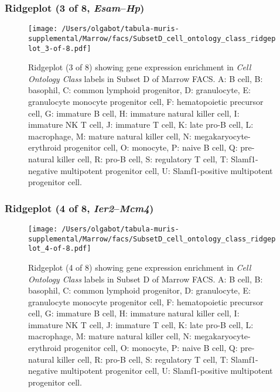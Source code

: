 \subsubsection{Ridgeplot (3 of 8, \emph{Esam}--\emph{Hp})}
\begin{figure}[h]
\centering
\texttt{[image: /Users/olgabot/tabula-muris-supplemental/Marrow/facs/SubsetD\_cell\_ontology\_class\_ridgeplot\_3-of-8.pdf]}

\caption{ Ridgeplot (3 of 8)  showing gene expression enrichment in \emph{Cell Ontology Class} labels in Subset D of Marrow FACS. A: B cell, B: basophil, C: common lymphoid progenitor, D: granulocyte, E: granulocyte monocyte progenitor cell, F: hematopoietic precursor cell, G: immature B cell, H: immature natural killer cell, I: immature NK T cell, J: immature T cell, K: late pro-B cell, L: macrophage, M: mature natural killer cell, N: megakaryocyte-erythroid progenitor cell, O: monocyte, P: naive B cell, Q: pre-natural killer cell, R: pro-B cell, S: regulatory T cell, T: Slamf1-negative multipotent progenitor cell, U: Slamf1-positive multipotent progenitor cell.}
\end{figure}


\clearpage

\subsubsection{Ridgeplot (4 of 8, \emph{Ier2}--\emph{Mcm4})}
\begin{figure}[h]
\centering
\texttt{[image: /Users/olgabot/tabula-muris-supplemental/Marrow/facs/SubsetD\_cell\_ontology\_class\_ridgeplot\_4-of-8.pdf]}

\caption{ Ridgeplot (4 of 8)  showing gene expression enrichment in \emph{Cell Ontology Class} labels in Subset D of Marrow FACS. A: B cell, B: basophil, C: common lymphoid progenitor, D: granulocyte, E: granulocyte monocyte progenitor cell, F: hematopoietic precursor cell, G: immature B cell, H: immature natural killer cell, I: immature NK T cell, J: immature T cell, K: late pro-B cell, L: macrophage, M: mature natural killer cell, N: megakaryocyte-erythroid progenitor cell, O: monocyte, P: naive B cell, Q: pre-natural killer cell, R: pro-B cell, S: regulatory T cell, T: Slamf1-negative multipotent progenitor cell, U: Slamf1-positive multipotent progenitor cell.}
\end{figure}


\clearpage

